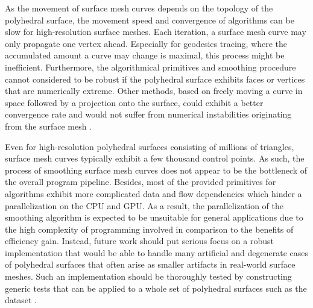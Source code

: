 \documentclass[crop=false]{stdlocal}
\begin{document}
  As the movement of surface mesh curves depends on the topology of the polyhedral surface, the movement speed and convergence of algorithms can be slow for high-resolution surface meshes.
  Each iteration, a surface mesh curve may only propagate one vertex ahead.
  Especially for geodesics tracing, where the accumulated amount a curve may change is maximal, this process might be inefficient.
  Furthermore, the algorithmical primitives and smoothing procedure cannot considered to be robust if the polyhedral surface exhibits faces or vertices that are numerically extreme.
  Other methods, based on freely moving a curve in space followed by a projection onto the surface, could exhibit a better convergence rate and would not suffer from numerical instabilities originating from the surface mesh \autocite{crane2020}.

  Even for high-resolution polyhedral surfaces consisting of millions of triangles, surface mesh curves typically exhibit a few thousand control points.
  As such, the process of smoothing surface mesh curves does not appear to be the bottleneck of the overall program pipeline.
  Besides, most of the provided primitives for algorithms exhibit more complicated data and flow dependencies which hinder a parallelization on the CPU and GPU.
  As a result, the parallelization of the smoothing algorithm is expected to be unsuitable for general applications due to the high complexity of programming involved in comparison to the benefits of efficiency gain.
  Instead, future work should put serious focus on a robust implementation that would be able to handle many artificial and degenerate cases of polyhedral surfaces that often arise as smaller artifacts in real-world surface meshes.
  Such an implementation should be thoroughly tested by constructing generic tests that can be applied to a whole set of polyhedral surfaces such as the  dataset \autocite{thingi10k,mancinelli2022}.
\end{document}
